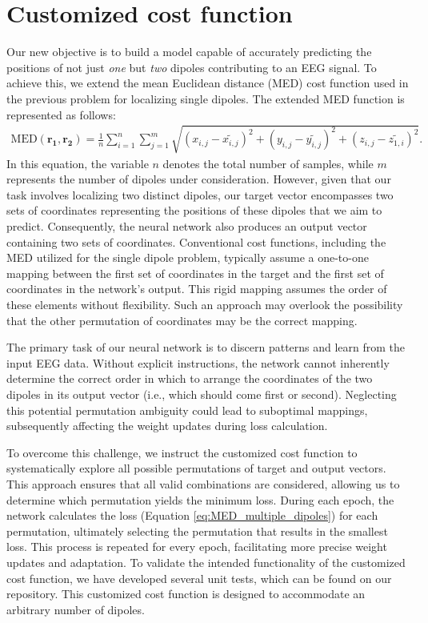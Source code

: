 \documentclass[a4paper, UKenglish, 11pt]{uiomaster}
\begin{document}
\section{Customized cost function}
Our new objective is to build a model capable of accurately predicting the positions of not just \emph{one} but \emph{two} dipoles contributing to an EEG signal. To achieve this, we extend the mean Euclidean distance (MED) cost function used in the previous problem for localizing single dipoles. The extended MED function is represented as follows:
\begin{equation}
\begin{aligned}
    \text{MED}(\mathbf{r_1}, \mathbf{r_2}) = \frac{1}{n}\sum_{i=1}^{n}\sum_{j=1}^{m} \sqrt{(x_{i,j} - \tilde{x_{i,j}})^2 + (y_{i,j} - \tilde{y_{i,j}})^2 + (z_{i,j} - \tilde{z_{1,i}})^2}.
\end{aligned}
\label{eq:MED_multiple_dipoles}
\end{equation}
In this equation, the variable $n$ denotes the total number of samples, while $m$ represents the number of dipoles under consideration. However, given that our task involves localizing two distinct dipoles, our target vector encompasses two sets of coordinates representing the positions of these dipoles that we aim to predict. Consequently, the neural network also produces an output vector containing two sets of coordinates. Conventional cost functions, including the MED utilized for the single dipole problem, typically assume a one-to-one mapping between the first set of coordinates in the target and the first set of coordinates in the network's output. This rigid mapping assumes the order of these elements without flexibility. Such an approach may overlook the possibility that the other permutation of coordinates may be the correct mapping.

The primary task of our neural network is to discern patterns and learn from the input EEG data. Without explicit instructions, the network cannot inherently determine the correct order in which to arrange the coordinates of the two dipoles in its output vector (i.e., which should come first or second). Neglecting this potential permutation ambiguity could lead to suboptimal mappings, subsequently affecting the weight updates during loss calculation.

To overcome this challenge, we instruct the customized cost function to systematically explore all possible permutations of target and output vectors. This approach ensures that all valid combinations are considered, allowing us to determine which permutation yields the minimum loss. During each epoch, the network calculates the loss (Equation \ref{eq:MED_multiple_dipoles}) for each permutation, ultimately selecting the permutation that results in the smallest loss. This process is repeated for every epoch, facilitating more precise weight updates and adaptation. To validate the intended functionality of the customized cost function, we have developed several unit tests, which can be found on our  repository. This customized cost function is designed to accommodate an arbitrary number of dipoles.
\end{document}

